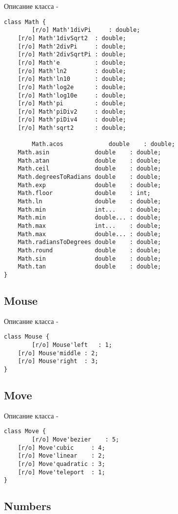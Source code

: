 \noindent Описание класса  -
\begin{lstlisting}[numbers=none]
class Math {
        [r/o] Math'1divPi     : double;
	[r/o] Math'1divSqrt2  : double;
	[r/o] Math'2divPi     : double;
	[r/o] Math'2divSqrtPi : double;
	[r/o] Math'e          : double;
	[r/o] Math'ln2        : double;
	[r/o] Math'ln10       : double;
	[r/o] Math'log2e      : double;
	[r/o] Math'log10e     : double;
	[r/o] Math'pi         : double;
	[r/o] Math'piDiv2     : double;
	[r/o] Math'piDiv4     : double;
	[r/o] Math'sqrt2      : double;
	
        Math.acos             double    : double;
	Math.asin             double    : double;
	Math.atan             double    : double;
	Math.ceil             double    : double;
	Math.degreesToRadians double    : double;
	Math.exp              double    : double;
	Math.floor            double    : int;
	Math.ln               double    : double;
	Math.min              int...    : double;
	Math.min              double... : double;
	Math.max              int...    : double;
	Math.max              double... : double;
	Math.radiansToDegrees double    : double;
	Math.round            double    : double;
	Math.sin              double    : double;
	Math.tan              double    : double;
}
\end{lstlisting}

\subsection{{\color{orange} Mouse}}

\noindent Описание класса  -
\begin{lstlisting}[numbers=none]
class Mouse {
        [r/o] Mouse'left   : 1;
	[r/o] Mouse'middle : 2;
	[r/o] Mouse'right  : 3;
}
\end{lstlisting}

\subsection{{\color{orange} Move}}

\noindent Описание класса  -
\begin{lstlisting}[numbers=none]
class Move {
        [r/o] Move'bezier    : 5;
	[r/o] Move'cubic     : 4;
	[r/o] Move'linear    : 2;
	[r/o] Move'quadratic : 3;
	[r/o] Move'teleport  : 1;
}
\end{lstlisting}

\subsection{{\color{orange} Numbers}}

